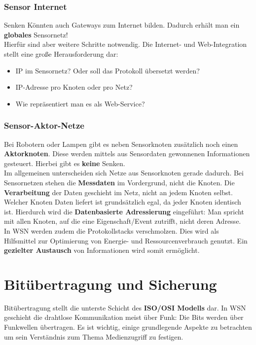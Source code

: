 \documentclass[a4paper]{article}
\begin{document}
\subsubsection{Sensor Internet}
Senken Könnten auch Gateways zum Internet bilden. Dadurch erhält man ein \textbf{globales} Sensornetz! \\
Hierfür sind aber weitere Schritte notwendig. Die Internet- und Web-Integration stellt eine große Herausforderung dar:
\begin{itemize}
	\item IP im Sensornetz? Oder soll das Protokoll übersetzt werden?
	\item IP-Adresse pro Knoten oder pro Netz?
	\item Wie repräsentiert man es als Web-Service?
\end{itemize}
\subsubsection{Sensor-Aktor-Netze} 
Bei Robotern oder Lampen gibt es neben Sensorknoten zusätzlich noch einen \textbf{Aktorknoten}. Diese werden mittels aus Sensordaten gewonnenen Informationen gesteuert. Hierbei gibt es \textbf{keine} Senken.\\

Im allgemeinen unterscheiden sich Netze aus Sensorknoten gerade dadurch. Bei Sensornetzen stehen die \textbf{Messdaten} im Vordergrund, nicht die Knoten. Die \textbf{Verarbeitung} der Daten geschieht im Netz, nicht an jedem Knoten selbst. Welcher Knoten Daten liefert ist grundsätzlich egal, da jeder Knoten identisch ist. Hierdurch wird die \textbf{Datenbasierte Adressierung} eingeführt: Man spricht mit allen Knoten, auf die eine Eigenschaft/Event zutrifft, nicht deren Adresse.\\

In WSN werden zudem die Protokollstacks verschmolzen. Dies wird als Hilfsmittel zur Optimierung von Energie- und Ressourcenverbrauch genutzt. Ein \textbf{gezielter Austausch} von Informationen wird somit ermöglicht.

\newpage
\section{Bitübertragung und Sicherung}
Bitübertragung stellt die unterste Schicht des \textbf{ISO/OSI Modells} dar. In WSN geschieht die drahtlose Kommunikation meist über Funk: Die Bits werden über Funkwellen übertragen. Es ist wichtig, einige grundlegende Aspekte zu betrachten um sein Verständnis zum Thema Medienzugriff zu festigen.\\
\end{document}
